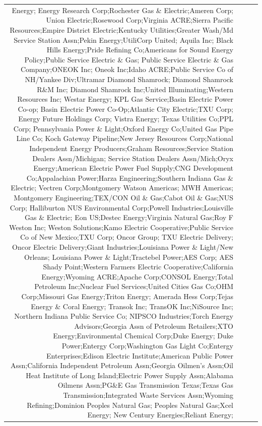 \documentclass[]{article}
\begin{document}
\begin{longtable}[]{@{}rlrl@{}}
Energy; Energy Research Corp;Rochester Gas \& Electric;Ameren Corp;
Union Electric;Rosewood Corp;Virginia ACRE;Sierra Pacific
Resources;Empire District Electric;Kentucky Utilities;Greater Wash/Md
Service Station Assn;Pekin Energy;UtiliCorp United; Aquila Inc; Black
Hills Energy;Pride Refining Co;Americans for Sound Energy Policy;Public
Service Electric \& Gas; Public Service Electric \& Gas Company;ONEOK
Inc; Oneok Inc;Idaho ACRE;Public Service Co of NH/Yankee Div;Ultramar
Diamond Shamrock; Diamond Shamrock R\&M Inc; Diamond Shamrock Inc;United
Illuminating;Western Resources Inc; Westar Energy; KPL Gas Service;Basin
Electric Power Co-op; Basin Electric Power Co-Op;Atlantic City
Electric;TXU Corp; Energy Future Holdings Corp; Vistra Energy; Texas
Utilities Co;PPL Corp; Pennsylvania Power \& Light;Oxford Energy
Co;United Gas Pipe Line Co; Koch Gateway Pipeline;New Jersey Resources
Corp;National Independent Energy Producers;Graham Resources;Service
Station Dealers Assn/Michigan; Service Station Dealers Assn/Mich;Oryx
Energy;American Electric Power Fuel Supply;CNG Development
Co;Appalachian Power;Harza Engineering;Southern Indiana Gas \& Electric;
Vectren Corp;Montgomery Watson Americas; MWH Americas; Montgomery
Engineering;TEX/CON Oil \& Gas;Cabot Oil \& Gas;NUS Corp; Halliburton
NUS Environmental Corp;Powell Industries;Louisville Gas \& Electric; Eon
US;Destec Energy;Virginia Natural Gas;Roy F Weston Inc; Weston
Solutions;Kamo Electric Cooperative;Public Service Co of New Mexico;TXU
Corp; Oncor Group; TXU Electric Delivery; Oncor Electric Delivery;Giant
Industries;Louisiana Power \& Light/New Orleans; Louisiana Power \&
Light;Tractebel Power;AES Corp; AES Shady Point;Western Farmers Electric
Cooperative;California Energy;Wyoming ACRE;Apache Corp;CONSOL
Energy;Total Petroleum Inc;Nuclear Fuel Services;United Cities Gas
Co;OHM Corp;Missouri Gas Energy;Triton Energy; Amerada Hess Corp;Tejas
Energy \& Coral Energy; Transok Inc; TransOK Inc;NiSource Inc; Northern
Indiana Public Service Co; NIPSCO Industries;Torch Energy
Advisors;Georgia Assn of Petroleum Retailers;XTO Energy;Environmental
Chemical Corp;Duke Energy; Duke Power;Entergy Corp;Washington Gas Light
Co;Entergy Enterprises;Edison Electric Institute;American Public Power
Assn;California Independent Petroleum Assn;Georgia Oilmen's Assn;Oil
Heat Institute of Long Island;Electric Power Supply Assn;Alabama Oilmens
Assn;PG\&E Gas Transmission Texas;Texas Gas Transmission;Integrated
Waste Services Assn;Wyoming Refining;Dominion Peoples Natural Gas;
Peoples Natural Gas;Xcel Energy; New Century Energies;Reliant Energy;

\end{longtable}
\end{document}
